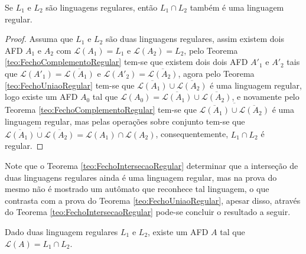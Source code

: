 \begin{theorem}\label{teo:FechoIntersecaoRegular}
	Se $L_1$ e $L_2$ são linguagens regulares, então $L_1 \cap L_2$ também é uma linguagem regular.
\end{theorem}

\begin{proof}
	Assuma que $L_1$ e $L_2$ são duas linguagens regulares, assim existem dois AFD $A_1$ e $A_2$ com $\mathcal{L}(A_1) = L_1$ e $\mathcal{L}(A_2) = L_2$, pelo Teorema \ref{teo:FechoComplementoRegular} tem-se que existem dois dois AFD $A'_1$ e $A'_2$ tais que $\mathcal{L}(A'_1) = \overline{\mathcal{L}(A_1)}$ e $\mathcal{L}(A'_2) = \overline{\mathcal{L}(A_2)}$, agora pelo Teorema \ref{teo:FechoUniaoRegular} tem-se que $\overline{\mathcal{L}(A_1)} \cup \overline{\mathcal{L}(A_2)}$ é uma linguagem regular, logo existe um AFD $A_0$ tal que $\mathcal{L}(A_0) = \overline{\mathcal{L}(A_1)} \cup \overline{\mathcal{L}(A_2)}$, e novamente pelo Teorema \ref{teo:FechoComplementoRegular} tem-se que $\overline{\overline{\mathcal{L}(A_1)} \cup \overline{\mathcal{L}(A_2)}}$ é uma linguagem regular, mas pelas operações sobre conjunto tem-se que $\overline{\overline{\mathcal{L}(A_1)} \cup \overline{\mathcal{L}(A_2)}} = \mathcal{L}(A_1) \cap \mathcal{L}(A_2)$, consequentemente, $L_1 \cap L_2$ é regular.
\end{proof}

Note que o Teorema \ref{teo:FechoIntersecaoRegular} determinar que a interseção de duas linguagens regulares ainda é uma linguagem regular, mas na prova do mesmo não é mostrado um autômato que reconhece tal linguagem, o que contrasta com a prova do Teorema \ref{teo:FechoUniaoRegular}, apesar disso, através do Teorema \ref{teo:FechoIntersecaoRegular} pode-se concluir o resultado a seguir.

\begin{corollary}
	Dado duas linguagem regulares $L_1$ e $L_2$, existe um AFD $A$ tal que $\mathcal{L}(A) = L_1 \cap L_2$.
\end{corollary}

